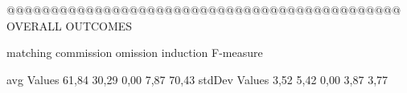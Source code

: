  @@@@@@@@@@@@@@@@@@@@@@@@@@@@@@@@@@@@@@@@@@@@@ OVERALL OUTCOMES

               matching commission   omission  induction  F-measure
      
avg Values      61,84      30,29      0,00      7,87    70,43       
stdDev Values    3,52      5,42       0,00       3,87     3,77       
